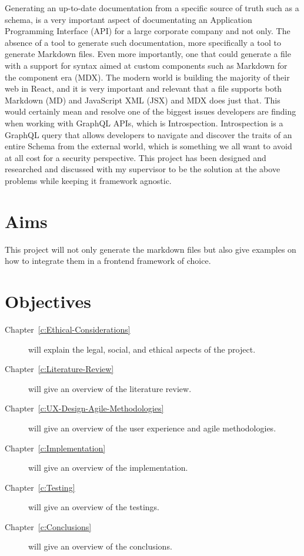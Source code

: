 Generating an up-to-date documentation from a specific source of truth such as a
schema, is a very important aspect of documentating an Application Programming
Interface (API) for a large corporate company and not only. The absence of a
tool to generate such documentation, more specifically a tool to generate
Markdown files. Even more importantly, one that could generate a file with a
support for syntax aimed at custom components such as Markdown for the component
era (MDX). The modern world is building the majority of their web in React, and
it is very important and relevant that a file supports both Markdown (MD) and
JavaScript XML (JSX) and MDX does just that. This would certainly mean and
resolve one of the biggest issues developers are finding when working with
GraphQL APIs, which is Introspection. Introspection is a GraphQL query that
allows developers to navigate and discover the traits of an entire Schema from
the external world, which is something we all want to avoid at all cost for a
security perspective. This project has been designed and researched and
discussed with my supervisor to be the solution at the above problems while
keeping it framework agnostic.

\section{Aims}
\label{s:Aim}

This project will not only generate the markdown files but also give examples on
how to integrate them in a frontend framework of choice.

\section{Objectives}
\label{s:Objectives}

\begin{description}


  \item[Chapter~\ref{c:Ethical-Considerations}] will explain the legal, social, and ethical aspects of the project.

  \item[Chapter~\ref{c:Literature-Review}] will give an overview of the literature review.

  \item[Chapter~\ref{c:UX-Design-Agile-Methodologies}] will give an overview of the user experience and agile methodologies.

  \item[Chapter~\ref{c:Implementation}] will give an overview of the implementation.

  \item[Chapter~\ref{c:Testing}] will give an overview of the testings.

  \item[Chapter~\ref{c:Conclusions}] will give an overview of the conclusions.

\end{description}
